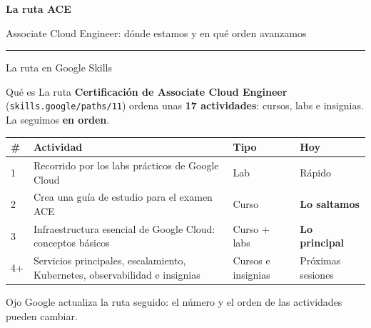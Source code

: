 \documentclass[aspectratio=169,10pt,c]{beamer}
\begin{document}
\begin{frame}[plain]
\vfill
\begin{center}
{\fontsize{29}{34}\selectfont\bfseries La ruta ACE}\par
\vspace{2mm}
{\small Associate Cloud Engineer: dónde estamos y en qué orden avanzamos}\par
\vspace{4mm}
{\color{utpRojo}\rule{8.5cm}{1.2pt}}
\end{center}
\vfill
\end{frame}

\begin{frame}{La ruta en Google Skills}
\begin{block}{Qué es}
\small La ruta \textbf{Certificación de Associate Cloud Engineer} (\texttt{skills.google/paths/11}) ordena unas \textbf{17 actividades}: cursos, labs e insignias. La seguimos \textbf{en orden}.
\end{block}
\renewcommand{\arraystretch}{1.3}
\centering\small
\begin{tabular}{@{}p{0.6cm}p{6.6cm}p{2.2cm}p{3.2cm}@{}}
\toprule
\textbf{\#} & \textbf{Actividad} & \textbf{Tipo} & \textbf{Hoy}\\
\midrule
1 & Recorrido por los labs prácticos de Google Cloud & Lab & Rápido\\
2 & Crea una guía de estudio para el examen ACE & Curso & \textbf{Lo saltamos}\\
3 & Infraestructura esencial de Google Cloud: conceptos básicos & Curso + labs & \textbf{Lo principal}\\
4+ & Servicios principales, escalamiento, Kubernetes, observabilidad e insignias & Cursos e insignias & Próximas sesiones\\
\bottomrule
\end{tabular}
\par\vspace{2mm}
\begin{alertblock}{Ojo}
\small Google actualiza la ruta seguido: el número y el orden de las actividades pueden cambiar.
\end{alertblock}
\end{frame}
\end{document}
